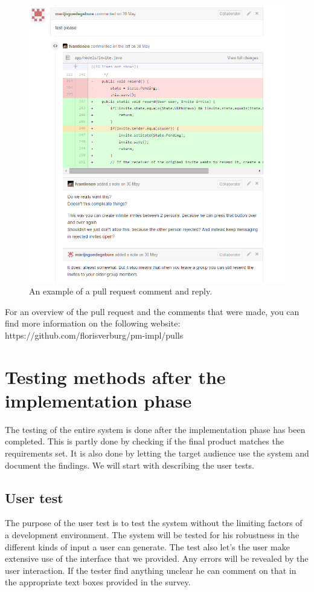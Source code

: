 \begin{figure}[h]
    \centering
    \includegraphics[width=\textwidth]{images/pullrequest-example1}
    \caption{An example of a pull request comment and reply.}
    \label{pullrequest-example}
\end{figure}

For an overview of the pull request and the comments that were made, you can find more information on the following website:
https://github.com/florisverburg/pm-impl/pulls

\section{Testing methods after the implementation phase}
The testing of the entire system is done after the implementation phase has been completed.
This is partly done by checking if the final product matches the requirements set.
It is also done by letting the target audience use the system and document the findings.
We will start with describing the user tests.

\subsection{User test}
The purpose of the user test is to test the system without the limiting factors of a development environment.
The system will be tested for his robustness in the different kinds of input a user can generate.
The test also let's the user make extensive use of the interface that we provided.
Any errors will be revealed by the user interaction.
If the tester find anything unclear he can comment on that in the appropriate text boxes provided in the survey.

